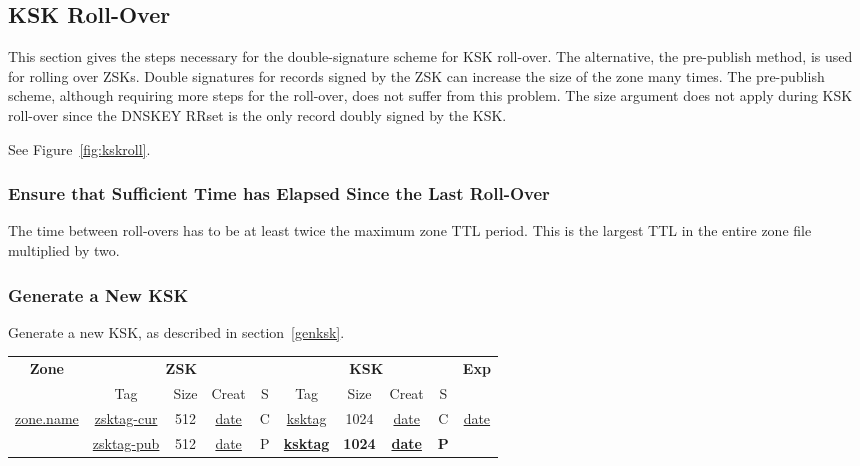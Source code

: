 
\clearpage
\subsection{KSK Roll-Over}
\label{roll-ksk}

This section gives the steps necessary for the double-signature scheme for
KSK roll-over.  The alternative, the pre-publish method, is used for rolling
over ZSKs.  Double signatures for records signed by the ZSK can increase the
size of the zone many times.  The pre-publish scheme, although requiring more
steps for the roll-over, does not suffer from this problem. The size argument
does not apply during KSK roll-over since the DNSKEY RRset is the only record
doubly signed by the KSK.

See Figure~\ref{fig:kskroll}.


\subsubsection{Ensure that Sufficient Time has Elapsed Since the Last Roll-Over}

The time between roll-overs has to be at least twice the maximum zone TTL
period.  This is the largest TTL in the entire zone file multiplied by two.


\subsubsection{Generate a New KSK}

Generate a new KSK, as described in section~\ref{genksk}.

\begin{center}
\begin{tabular}{|c|c|c|c|c|c|c|c|c|c|}
\hline
{\bf Zone} &
\multicolumn{4}{c|}{{\bf ZSK}} &
\multicolumn{4}{c|}{{\bf KSK}} &
{\bf Exp} \\
\cline{2-9}

 & Tag & Size & Creat & S & Tag & Size & Creat & S & \\
\hline

\underline{zone.name}	&
\underline{zsktag-cur}	&
512			&
\underline{date}	&
C			&
\underline{ksktag}	&
1024			&
\underline{date}	&
C			&
\underline{date}	\\

\cline{2-9}

				&
\underline{zsktag-pub}		&
512				&
\underline{date}		&
P				&
{\bf \underline{ksktag}}	&
{\bf 1024}			&
{\bf \underline{date}}		&
{\bf P}				&
				\\

\hline
\end{tabular}
\end{center}

